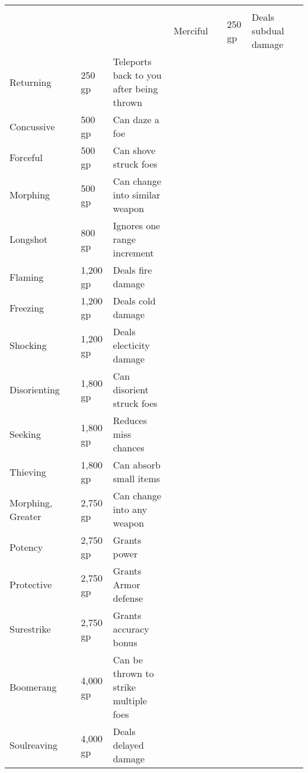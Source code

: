 
\begin{longtablewrapper}
\begin{longtable}{p{15em} p{3em} p{6em} p{25em} p{3em}}

 \\
 &  &  &  &  \tableheaderrule
Merciful &  & 250 gp & Deals subdual damage & \pageref{item:Merciful} \\
Returning &  & 250 gp & Teleports back to you after being thrown & \pageref{item:Returning} \\
Concussive &  & 500 gp & Can daze a foe & \pageref{item:Concussive} \\
Forceful &  & 500 gp & Can shove struck foes & \pageref{item:Forceful} \\
Morphing &  & 500 gp & Can change into similar weapon & \pageref{item:Morphing} \\
Longshot &  & 800 gp & Ignores one range increment & \pageref{item:Longshot} \\
Flaming &  & 1,200 gp & Deals fire damage & \pageref{item:Flaming} \\
Freezing &  & 1,200 gp & Deals cold damage & \pageref{item:Freezing} \\
Shocking &  & 1,200 gp & Deals electicity damage & \pageref{item:Shocking} \\
Disorienting &  & 1,800 gp & Can disorient struck foes & \pageref{item:Disorienting} \\
Seeking &  & 1,800 gp & Reduces miss chances & \pageref{item:Seeking} \\
Thieving &  & 1,800 gp & Can absorb small items & \pageref{item:Thieving} \\
Morphing, Greater &  & 2,750 gp & Can change into any weapon & \pageref{item:Morphing, Greater} \\
Potency &  & 2,750 gp & Grants   power & \pageref{item:Potency} \\
Protective &  & 2,750 gp & Grants  Armor defense & \pageref{item:Protective} \\
Surestrike &  & 2,750 gp & Grants  accuracy bonus & \pageref{item:Surestrike} \\
Boomerang &  & 4,000 gp & Can be thrown to strike multiple foes & \pageref{item:Boomerang} \\
Soulreaving &  & 4,000 gp & Deals delayed damage & \pageref{item:Soulreaving} \\

\end{longtable}
\end{longtablewrapper}
